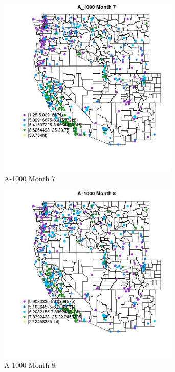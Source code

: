 \begin{figure} 
\centering  
\includegraphics[width=0.77\textwidth]{Code_Outputs/ML_input_report_ML_input_PM25_Step5_part_d_de_duplicated_aves_ML_input_MapObsMo7A_1000.jpg} 
\caption{\label{fig:ML_input_report_ML_input_PM25_Step5_part_d_de_duplicated_aves_ML_inputMapObsMo7A_1000}A-1000 Month 7} 
\end{figure} 
 

\begin{figure} 
\centering  
\includegraphics[width=0.77\textwidth]{Code_Outputs/ML_input_report_ML_input_PM25_Step5_part_d_de_duplicated_aves_ML_input_MapObsMo8A_1000.jpg} 
\caption{\label{fig:ML_input_report_ML_input_PM25_Step5_part_d_de_duplicated_aves_ML_inputMapObsMo8A_1000}A-1000 Month 8} 
\end{figure} 
 

